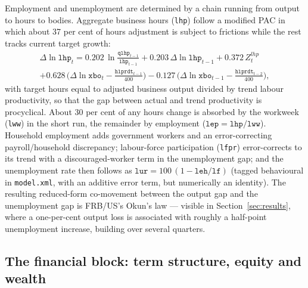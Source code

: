 Employment and unemployment are determined by a chain running from output to hours to bodies. Aggregate business hours (\texttt{lhp}) follow a modified PAC in which about 37 per cent of hours adjustment is subject to frictions while the rest tracks current target growth:
\begin{multline}
\Delta\ln \texttt{lhp}_t = 0.202\,\ln\tfrac{\texttt{qlhp}_{t-1}}{\texttt{lhp}_{t-1}} + 0.203\,\Delta\ln \texttt{lhp}_{t-1} + 0.372\,Z^{lhp}_t \\
 + 0.628\,\big(\Delta\ln \texttt{xbo}_t - \tfrac{\texttt{hlprdt}_{t-1}}{400}\big) - 0.127\,\big(\Delta\ln \texttt{xbo}_{t-1} - \tfrac{\texttt{hlprdt}_{t-2}}{400}\big),
\label{eq:lhp}
\end{multline}
with target hours equal to adjusted business output divided by trend labour productivity, so that the gap between actual and trend productivity is procyclical. About 30 per cent of any hours change is absorbed by the workweek (\texttt{lww}) in the short run, the remainder by employment ($\texttt{lep}=\texttt{lhp}/\texttt{lww}$). Household employment adds government workers and an error-correcting payroll/household discrepancy; labour-force participation (\texttt{lfpr}) error-corrects to its trend with a discouraged-worker term in the unemployment gap; and the unemployment rate then follows as $\texttt{lur}=100\,(1-\texttt{leh}/\texttt{lf})$ (tagged behavioural in \texttt{model.xml}, with an additive error term, but numerically an identity). The resulting reduced-form co-movement between the output gap and the unemployment gap is FRB/US's Okun's law --- visible in Section~\ref{sec:results}, where a one-per-cent output loss is associated with roughly a half-point unemployment increase, building over several quarters.

\subsection{The financial block: term structure, equity and wealth}
\label{sec:finblock}

